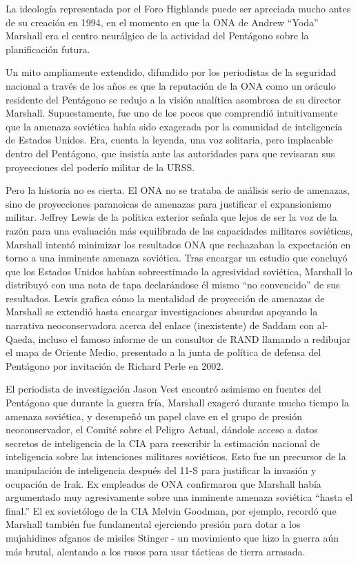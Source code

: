 \documentclass[10pt,a5paper,twoside,spanish,]{book}
\begin{document}
La ideología representada por el Foro Highlands puede ser apreciada
mucho antes de su creación en 1994, en el momento en que la ONA de
Andrew ``Yoda'' Marshall era el centro neurálgico de la actividad del
Pentágono sobre la planificación futura.

Un mito ampliamente extendido, difundido por los periodistas de la
seguridad nacional a través de los años es que la reputación de la ONA
como un oráculo residente del Pentágono se redujo a la visión analítica
asombrosa de su director Marshall. Supuestamente, fue uno de los pocos
que comprendió intuitivamente que la amenaza soviética había sido
exagerada por la comunidad de inteligencia de Estados Unidos. Era,
cuenta la leyenda, una voz solitaria, pero implacable dentro del
Pentágono, que insistía ante las autoridades para que revisaran sus
proyecciones del poderío militar de la URSS.

Pero la historia no es cierta. El ONA no se trataba de análisis serio de
amenazas, sino de proyecciones paranoicas de amenazas para justificar el
expansionismo militar. Jeffrey Lewis de la política exterior señala que
lejos de ser la voz de la razón para una evaluación más equilibrada de
las capacidades militares soviéticas, Marshall intentó minimizar los
resultados ONA que rechazaban la expectación en torno a una inminente
amenaza soviética. Tras encargar un estudio que concluyó que los Estados
Unidos habían sobreestimado la agresividad soviética, Marshall lo
distribuyó con una nota de tapa declarándose él mismo ``no convencido''
de sus resultados. Lewis grafica cómo la mentalidad de proyección de
amenazas de Marshall se extendió hasta encargar investigaciones absurdas
apoyando la narrativa neoconservadora acerca del enlace (inexistente) de
Saddam con al-Qaeda, incluso el famoso informe de un consultor de RAND
llamando a redibujar el mapa de Oriente Medio, presentado a la junta de
política de defensa del Pentágono por invitación de Richard Perle en
2002.

El periodista de investigación Jason Vest encontró asimismo en fuentes
del Pentágono que durante la guerra fría, Marshall exageró durante mucho
tiempo la amenaza soviética, y desempeñó un papel clave en el grupo de
presión neoconservador, el Comité sobre el Peligro Actual, dándole
acceso a datos secretos de inteligencia de la CIA para reescribir la
estimación nacional de inteligencia sobre las intenciones militares
soviéticos. Esto fue un precursor de la manipulación de inteligencia
después del 11-S para justificar la invasión y ocupación de Irak. Ex
empleados de ONA confirmaron que Marshall había argumentado muy
agresivamente sobre una inminente amenaza soviética ``hasta el final.''
El ex sovietólogo de la CIA Melvin Goodman, por ejemplo, recordó que
Marshall también fue fundamental ejerciendo presión para dotar a los
mujahidines afganos de misiles Stinger - un movimiento que hizo la
guerra aún más brutal, alentando a los rusos para usar tácticas de
tierra arrasada.
\end{document}
